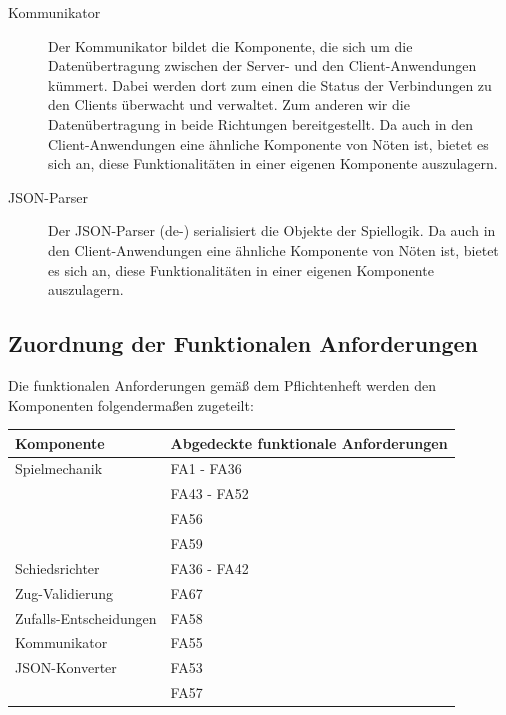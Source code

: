\begin{description}
			\item[Kommunikator]
			Der Kommunikator bildet die Komponente, die sich um die Datenübertragung zwischen der Server- und den Client-Anwendungen kümmert. Dabei werden dort zum einen die Status der Verbindungen zu den Clients überwacht und verwaltet. Zum anderen wir die Datenübertragung in beide Richtungen bereitgestellt. Da auch in den Client-Anwendungen eine ähnliche Komponente von Nöten ist, bietet es sich an, diese Funktionalitäten in einer eigenen Komponente auszulagern.
			
			\item[JSON-Parser]
			Der JSON-Parser (de-) serialisiert die Objekte der Spiellogik. Da auch in den Client-Anwendungen eine ähnliche Komponente von Nöten ist, bietet es sich an, diese Funktionalitäten in einer eigenen Komponente auszulagern.  

		\end{description}
		
	\subsection{Zuordnung der Funktionalen Anforderungen}
	
	Die funktionalen Anforderungen gemäß dem Pflichtenheft werden den Komponenten folgendermaßen zugeteilt:

	\begin{table}[h]
	\centering
	\begin{tabular}{|l|l|}
		\hline
		\textbf{Komponente} & \textbf{Abgedeckte funktionale Anforderungen}\\ \hline
		Spielmechanik & FA1 - FA36 \\
		& FA43 - FA52 \\
		& FA56 \\
		& FA59 \\ \hline
		
		Schiedsrichter & FA36 - FA42 \\ \hline
		
		Zug-Validierung & FA67 \\ \hline
		
		Zufalls-Entscheidungen & FA58 \\ \hline	
		
		Kommunikator & FA55 \\ \hline
		
		JSON-Konverter & FA53 \\
		& FA57\\ \hline

	
	\end{tabular}
	\end{table}